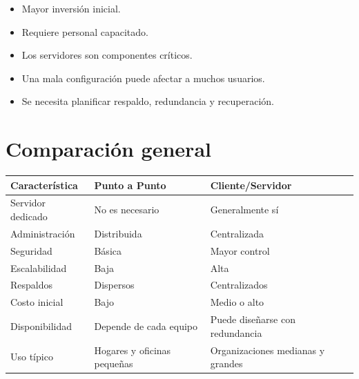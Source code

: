 \documentclass[
  spanish,
  letterpaper,
]{scrbook}
\newcounter{none} %
\providecommand{\tightlist}{%
  \setlength{\itemsep}{0pt}\setlength{\parskip}{0pt}}
\begin{document}
\begin{itemize}
\tightlist
\item
  Mayor inversión inicial.
\item
  Requiere personal capacitado.
\item
  Los servidores son componentes críticos.
\item
  Una mala configuración puede afectar a muchos usuarios.
\item
  Se necesita planificar respaldo, redundancia y recuperación.
\end{itemize}

\section{Comparación general}\label{comparaciuxf3n-general}

{\def\LTcaptype{none} %
\begin{longtable}[]{@{}
  >{\raggedright\arraybackslash}p{}
  >{\raggedright\arraybackslash}p{}
  >{\raggedright\arraybackslash}p{}@{}}
\toprule\noalign{}
\begin{minipage}[b]{\linewidth}\raggedright
Característica
\end{minipage} & \begin{minipage}[b]{\linewidth}\raggedright
Punto a Punto
\end{minipage} & \begin{minipage}[b]{\linewidth}\raggedright
Cliente/Servidor
\end{minipage} \\
\midrule\noalign{}
\endhead
\bottomrule\noalign{}
\endlastfoot
Servidor dedicado & No es necesario & Generalmente sí \\
Administración & Distribuida & Centralizada \\
Seguridad & Básica & Mayor control \\
Escalabilidad & Baja & Alta \\
Respaldos & Dispersos & Centralizados \\
Costo inicial & Bajo & Medio o alto \\
Disponibilidad & Depende de cada equipo & Puede diseñarse con
redundancia \\
Uso típico & Hogares y oficinas pequeñas & Organizaciones medianas y
grandes \\
\end{longtable}
}
\end{document}
